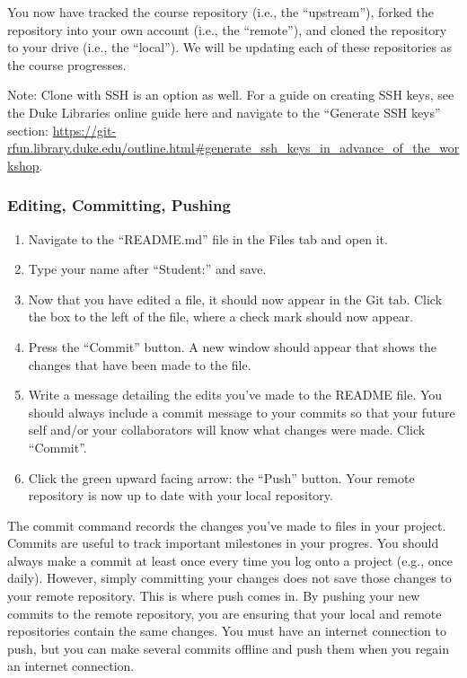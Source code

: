 \documentclass[
]{article}
\begin{document}
You now have tracked the course repository (i.e., the ``upstream''),
forked the repository into your own account (i.e., the ``remote''), and
cloned the repository to your drive (i.e., the ``local''). We will be
updating each of these repositories as the course progresses.

Note: Clone with SSH is an option as well. For a guide on creating SSH
keys, see the Duke Libraries online guide here and navigate to the
``Generate SSH keys'' section:
\url{https://git-rfun.library.duke.edu/outline.html\#generate_ssh_keys_in_advance_of_the_workshop}.

\hypertarget{editing-committing-pushing}{%
\subsubsection{Editing, Committing,
Pushing}\label{editing-committing-pushing}}

\begin{enumerate}
\def\labelenumi{\arabic{enumi}.}
\item
  Navigate to the ``README.md'' file in the Files tab and open it.
\item
  Type your name after ``Student:'' and save.
\item
  Now that you have edited a file, it should now appear in the Git tab.
  Click the box to the left of the file, where a check mark should now
  appear.
\item
  Press the ``Commit'' button. A new window should appear that shows the
  changes that have been made to the file.
\item
  Write a message detailing the edits you've made to the README file.
  You should always include a commit message to your commits so that
  your future self and/or your collaborators will know what changes were
  made. Click ``Commit''.
\item
  Click the green upward facing arrow: the ``Push'' button. Your remote
  repository is now up to date with your local repository.
\end{enumerate}

The commit command records the changes you've made to files in your
project. Commits are useful to track important milestones in your
progres. You should always make a commit at least once every time you
log onto a project (e.g., once daily). However, simply committing your
changes does not save those changes to your remote repository. This is
where push comes in. By pushing your new commits to the remote
repository, you are ensuring that your local and remote repositories
contain the same changes. You must have an internet connection to push,
but you can make several commits offline and push them when you regain
an internet connection.
\end{document}
